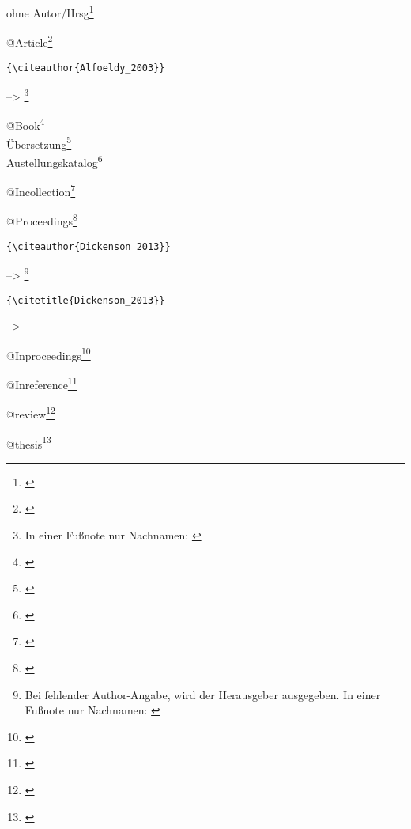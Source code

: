 \documentclass[%
	english,ngerman,%
	11pt,
	paper=A4,					%
draft=false,						%
demo,
	parskip=half+,				%
]{scrreprt}%
\begin{document}
ohne Autor/Hrsg\footnote{\cite{Italie_1976,Cosa_1949,Paestum_1854}}%


@Article\footnote{
\cite{Alfoeldy_2003,Allison_2001,Andreae_1957,Anichini_2012,Babcock_1962,Ball_2013,Bartosiewicz_2003,Baumgart_1935}
}
\begin{footnotesize}
\begin{verbatim}{\citeauthor{Alfoeldy_2003}} \end{verbatim} --> \citeauthor{Alfoeldy_2003}\footnote{In einer Fußnote nur Nachnamen: \citeauthor{Alfoeldy_2003}}
\end{footnotesize}

@Book\footnote{\cite{Beard_2008,Haug_2003,Hilger_2011,Kienast_2004,Kleinwaechter_2001,Kreikenbom_2011,Pedley_1990,Rich_2002}}\\
Übersetzung\footnote{\cite{Lefebvre_2000,Lefebvre_2011}}\\
Austellungskatalog\footnote{\cite{Horn_1976}}

@Incollection\footnote{\cite{Brogiolo_2006,Burgio_2012,Calapa_2009,Christie_2009,Colin_2000,Davies_2014,Demandt_1982}}

@Proceedings\footnote{\cite{Dickenson_2013,Giannikouri_2011,Hekster_2009,Kurapkat_2014,Maggi_2011}}
\\
\begin{footnotesize}
\begin{verbatim}{\citeauthor{Dickenson_2013}} \end{verbatim} --> \citeauthor{Dickenson_2013}\footnote{Bei fehlender Author-Angabe, wird der Herausgeber ausgegeben. In einer Fußnote nur Nachnamen:  \citeauthor{Dickenson_2013}}
\begin{verbatim}{\citetitle{Dickenson_2013}} \end{verbatim}  --> 
\end{footnotesize}

@Inproceedings\footnote{\cite{Bacchetta_2011,Coqueugniot_2011,Danner_2014,Poupaki_2011,Santoriello_1999,Torelli_1991,Torelli_1988,Tosi_1995}}

@Inreference\footnote{\cite{Rosenberger_2012,Booms_2014,CiancioRossetto_1993,Eder_2001a,Graffunder_1914,Jongman_2001,Kornemann_1933}}

@review\footnote{\cite{Baker_2011,Bell_2011,Bernard_2013,Chamberland_1999,Dyson_2013,Earl_2009,Frost_2001,Giuliano_1978,Hufschmid_2010,Kaiser_2014a}}

@thesis\footnote{\cite{Arnolds_2005,Evangelidis_2007,Hoevelborn_1983,Johanson_2008,Kienlin_2004a}}
\end{document}
